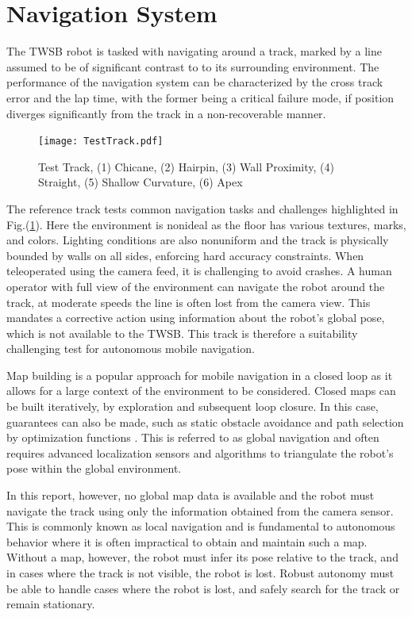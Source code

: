         \pagebreak{}
        \section{Navigation System}
        The TWSB robot is tasked with navigating around a track, marked by a line assumed to be of significant contrast to to its 
        surrounding environment. The performance of the navigation system can be characterized by the cross track error and the lap time, 
        with the former being a critical failure mode, if position diverges significantly from the track in a non-recoverable manner.
        \begin{figure}[H]
            \centering
            \texttt{[image: TestTrack.pdf]}
            \caption{Test Track, (1) Chicane, (2) Hairpin, (3) Wall Proximity, (4) Straight, (5) Shallow Curvature, (6) Apex}
            \label{fig:TestTrack}
        \end{figure}
        The reference track tests common navigation tasks and challenges highlighted in Fig.(\ref{fig:TestTrack}). 
        Here the environment is nonideal as the floor has various textures, marks, and colors.
        Lighting conditions are also nonuniform and the track is physically bounded by walls on all sides, enforcing hard accuracy constraints. 
        When teleoperated using the camera feed, it is challenging to avoid crashes. A human operator with 
        full view of the environment can navigate the robot around the track, at moderate speeds the line is often lost 
        from the camera view. This mandates a corrective action using information about the robot's global pose, 
        which is not available to the TWSB. This track is therefore a suitability challenging test for autonomous mobile navigation.
            
        Map building is a popular approach for mobile navigation in a closed loop as it allows for a large 
        context of the environment to be considered. Closed maps can be built iteratively, by exploration 
        and subsequent loop closure. In this case, guarantees can also be made, 
        such as static obstacle avoidance and path selection by optimization functions \cite{Macenski_2020}. 
        This is referred to as global navigation and often requires advanced localization sensors 
        and algorithms to triangulate the robot's pose within the global environment.
        
        In this report, however, no global map data is available and the robot must navigate 
        the track using only the information obtained from the camera sensor. This is commonly known as local navigation
        and is fundamental to autonomous behavior where it is often impractical to obtain and maintain such a map. Without a map, 
        however, the robot must infer its pose relative to the track, and in cases where the track is not visible, the robot is lost. 
        Robust autonomy must be able to handle cases where the robot is lost, and safely search for the track or remain stationary. 

